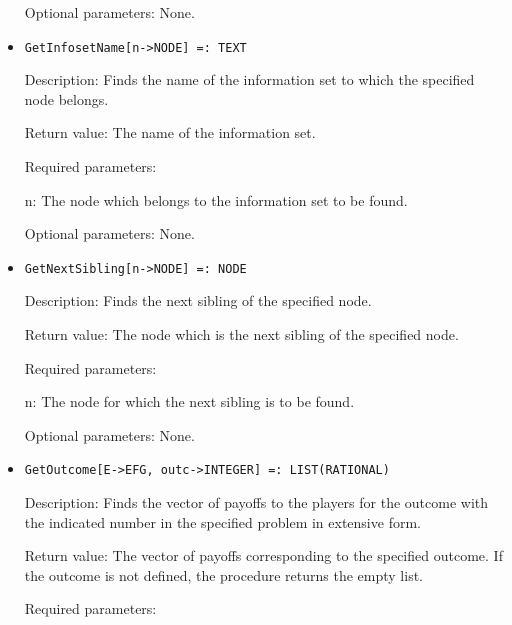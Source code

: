 \begin{itemize}
\item
[Optional parameters:] None.
\ed

\item
\protect \large \begin{verbatim}
GetInfosetName[n->NODE] =: TEXT
\end{verbatim}\normalsize

\bd
\item
[Description:] Finds the name of the information set to which the 
specified node belongs.
\item
[Return value:] The name of the information set.
\item
[Required parameters:]\hfil\null

\bd
\item
[ n:] The node which belongs to the information set to be found.
\ed

\item
[Optional parameters:] None.
\ed

\item
\protect \large \begin{verbatim}
GetNextSibling[n->NODE] =: NODE
\end{verbatim}\normalsize

\bd
\item
[Description:] Finds the next sibling of the specified node.
\item
[Return value:] The node which is the next sibling of the specified 
node.
\item
[Required parameters:]\hfil\null

\bd
\item
[ n:] The node for which the next sibling is to be found.
\ed

\item
[Optional parameters:] None.
\ed

\item
\protect \large \begin{verbatim}
GetOutcome[E->EFG, outc->INTEGER] =: LIST(RATIONAL)
\end{verbatim}\normalsize

\bd
\item
[Description:] Finds the vector of payoffs to the players for the 
outcome with the indicated number in the specified problem in extensive
form.
\item
[Return value:] The vector of payoffs corresponding to the specified 
outcome.  If the outcome is not defined, the procedure returns the 
empty list.
\item
[Required parameters:]\hfil\null


\end{itemize}
